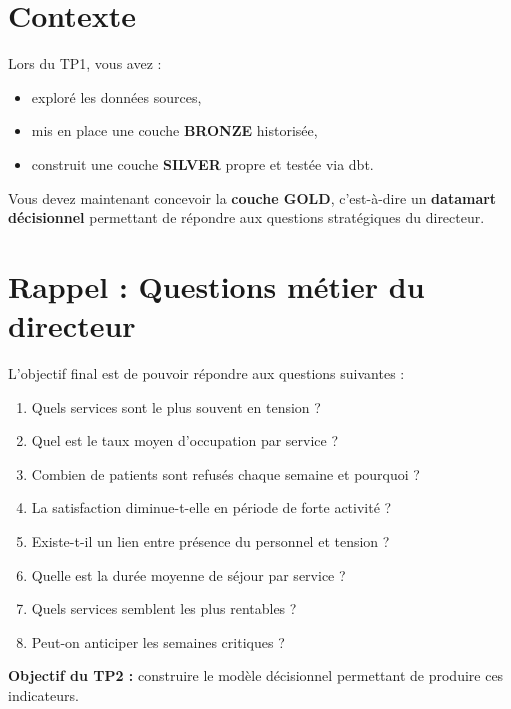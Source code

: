 \documentclass[11pt,a4paper]{article}
\begin{document}
\TPFrontPage


\section*{Contexte}

Lors du TP1, vous avez :

\begin{itemize}
  \item exploré les données sources,
  \item mis en place une couche \textbf{BRONZE} historisée,
  \item construit une couche \textbf{SILVER} propre et testée via dbt.
\end{itemize}

Vous devez maintenant concevoir la \textbf{couche GOLD},
c’est-à-dire un \textbf{datamart décisionnel} permettant de répondre
aux questions stratégiques du directeur.

\bigskip

\section*{Rappel : Questions métier du directeur}

L’objectif final est de pouvoir répondre aux questions suivantes :

\begin{enumerate}
  \item Quels services sont le plus souvent en tension ?
  \item Quel est le taux moyen d’occupation par service ?
  \item Combien de patients sont refusés chaque semaine et pourquoi ?
  \item La satisfaction diminue-t-elle en période de forte activité ?
  \item Existe-t-il un lien entre présence du personnel et tension ?
  \item Quelle est la durée moyenne de séjour par service ?
  \item Quels services semblent les plus rentables ?
  \item Peut-on anticiper les semaines critiques ?
\end{enumerate}

\textbf{Objectif du TP2 :}
construire le modèle décisionnel permettant de produire ces indicateurs.
\end{document}
